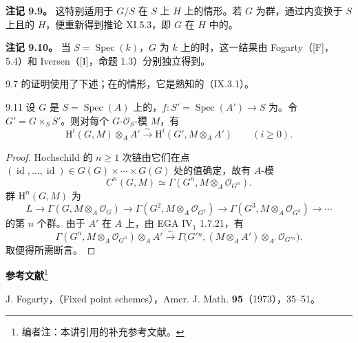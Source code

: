 \textbf{注记 9.9。} 这特别适用于 $G/S$ 在 $S$ 上 $H$ 上的情形。若 $G$ 为群，通过内变换于 $S$ 上且的 $H$，便重新得到推论 XI.5.3，即 $G$ 在 $H$ 中的。

\textbf{注记 9.10。} 当 $S=\operatorname{Spec}(k)$，$G$ 为 $k$ 上的时，这一结果由 Fogarty（[F]， 5.4）和 Iversen（[I]，命题 1.3）分别独立得到。

 9.7 的证明使用了下述；在的情形，它是熟知的（IX.3.1）。
\begin{SGAresult}{}{9.11}
设 $G$ 是 $S=\operatorname{Spec}(A)$ 上的，$f:S'=\operatorname{Spec}(A')\to S$ 为。令 $G'=G\times_SS'$。则对每个 $G$-$\mathcal O_S$-模 $M$，有
\[
\mathrm H^i(G,M)\otimes_AA'\xrightarrow{\sim}\mathrm H^i(G',M\otimes_AA')\qquad(i\geq0).
\]
\end{SGAresult}
\begin{proof}
Hochschild 的 $n\geq1$ 次链由它们在点 $(\operatorname{id},\ldots,\operatorname{id})\in G(G)\times\cdots\times G(G)$ 处的值确定，故有 $A$-模
\[
C^n(G,M)\simeq\Gamma(G^n,M\otimes_A\mathcal O_{G^n}).
\]
群 $\mathrm H^n(G,M)$ 为
\[
L\longrightarrow\Gamma(G,M\otimes_A\mathcal O_G)
\longrightarrow\Gamma(G^2,M\otimes_A\mathcal O_{G^2})
\longrightarrow\Gamma(G^3,M\otimes_A\mathcal O_{G^3})\longrightarrow\cdots
\]
的第 $n$ 个群。由于 $A'$ 在 $A$ 上，由 EGA IV$_1$ 1.7.21，有
\[
\Gamma(G^n,M\otimes_A\mathcal O_{G^n})\otimes_AA'
\xrightarrow{\sim}\Gamma\bigl(G'{}^n,(M\otimes_AA')\otimes_{A'}\mathcal O_{G'{}^n}\bigr).
\]
取便得所需断言。
\end{proof}

\textbf{参考文献}\footnote{编者注：本讲引用的补充参考文献。}

\noindent [Fo73] J. Fogarty，\textit{}（Fixed point schemes），Amer. J. Math. \textbf{95}（1973），35--51。

